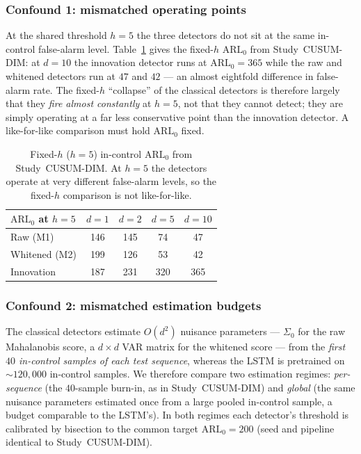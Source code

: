 \documentclass[bj,authoryear]{imsart}
\theoremstyle{plain}
\theoremstyle{definition}
\begin{document}
\subsubsection*{Confound 1: mismatched operating points}
At the shared threshold $h=5$ the three detectors do not sit at the same
in-control false-alarm level.  Table~\ref{tab:eqarl-arl} gives the fixed-$h$
$\mathrm{ARL}_0$ from Study~CUSUM-DIM: at $d=10$ the innovation detector runs
at $\mathrm{ARL}_0=365$ while the raw and whitened detectors run at $47$ and
$42$ --- an almost eightfold difference in false-alarm rate.  The fixed-$h$
``collapse'' of the classical detectors is therefore largely that they
\emph{fire almost constantly} at $h=5$, not that they cannot detect; they
are simply operating at a far less conservative point than the innovation
detector.  A like-for-like comparison must hold $\mathrm{ARL}_0$ fixed.

\begin{table}[ht]
\centering
\caption{Fixed-$h$ ($h=5$) in-control $\mathrm{ARL}_0$ from Study~CUSUM-DIM.
  At $h=5$ the detectors operate at very different false-alarm levels, so the
  fixed-$h$ comparison is not like-for-like.}
\label{tab:eqarl-arl}
\small
\begin{tabular}{lcccc}
\toprule
$\mathrm{ARL}_0$ at $h=5$ & $d=1$ & $d=2$ & $d=5$ & $d=10$ \\
\midrule
Raw (M1)      & 146 & 145 & 74  & 47  \\
Whitened (M2) & 199 & 126 & 53  & 42  \\
Innovation    & 187 & 231 & 320 & 365 \\
\bottomrule
\end{tabular}
\end{table}

\subsubsection*{Confound 2: mismatched estimation budgets}
The classical detectors estimate $O(d^2)$ nuisance parameters ---
$\Sigma_0$ for the raw Mahalanobis score, a $d\times d$ VAR matrix for the
whitened score --- from the \emph{first $40$ in-control samples of each test
sequence}, whereas the LSTM is pretrained on $\sim\!120{,}000$ in-control
samples.  We therefore compare two estimation regimes: \emph{per-sequence}
(the $40$-sample burn-in, as in Study~CUSUM-DIM) and \emph{global} (the same
nuisance parameters estimated once from a large pooled in-control sample, a
budget comparable to the LSTM's).  In both regimes each detector's threshold
is calibrated by bisection to the common target $\mathrm{ARL}_0=200$
(seed and pipeline identical to Study~CUSUM-DIM).
\end{document}
